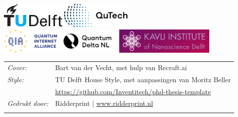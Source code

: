 \begin{titlepage}

\vfill

\begin{center}
\noindent
\includegraphics[height=0.5in]{figures/logos/tudelft.pdf}
\hfill
\includegraphics[height=0.5in]{figures/logos/qutech.pdf}
\hfill
\\ \vspace{2\baselineskip}
\includegraphics[height=0.5in]{figures/logos/qia.pdf}
\hfill
\includegraphics[height=0.5in]{figures/logos/qdnl.png}
\hfill
\includegraphics[height=0.5in]{figures/logos/kavli.pdf}
\end{center}

\vfill

\noindent
\begin{tabular}{@{}p{}@{}p{}}
    \textit{Cover:} & Bart van der Vecht, met hulp van Recraft.ai \\[\medskipamount]
    \textit{Style:} & TU Delft House Style, met aanpassingen van Moritz Beller \\
    & \url{https://github.com/Inventitech/phd-thesis-template} \\[\medskipamount]
    \textit{Gedrukt door:} & Ridderprint | \url{www.ridderprint.nl}\\
    & \\[\medskipamount]
\end{tabular}


\end{titlepage}
